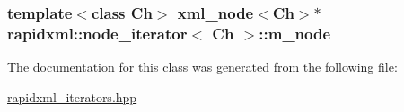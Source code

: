 \subsubsection[{m\+\_\+node}]{\setlength{\rightskip}{0pt plus 5cm}template$<$class Ch$>$ {\bf xml\+\_\+node}$<$Ch$>$$\ast$ {\bf rapidxml\+::node\+\_\+iterator}$<$ Ch $>$\+::m\+\_\+node\hspace{0.3cm}{\ttfamily [private]}}\label{classrapidxml_1_1node__iterator_adeb3cd87d8ea08aa56d14166146fa291}


The documentation for this class was generated from the following file\+:\begin{DoxyCompactItemize}
\item 
\hyperlink{rapidxml__iterators_8hpp}{rapidxml\+\_\+iterators.\+hpp}\end{DoxyCompactItemize}

